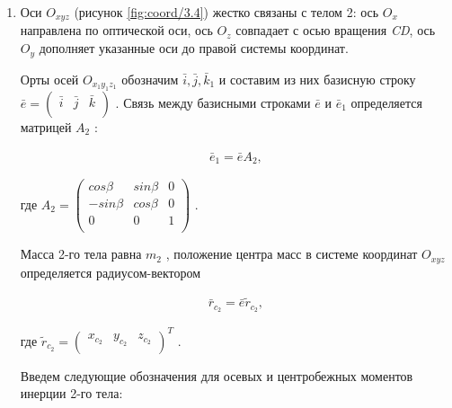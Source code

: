 \begin{enumerate}
	\item Оси  \( O_{xyz} \)  (рисунок \ref{fig:coord/3.4}) жестко связаны с телом 2: ось  \( O_x \)  направлена по оптической оси, ось  \( O_z \)  совпадает с осью вращения \textit{CD}, ось  \( O_y \)  дополняет указанные оси до правой системы координат.\par
	
	Орты осей  \( O_{x_{1}y_{1}z_{1}} \)  обозначим  \( \bar{i},\bar{j},\bar{k}_{1} \)  и составим из них базисную строку  
	\( \bar{e}= \left( \begin{matrix}	\bar{i}  &  \bar{j}  &  \bar{k}\\	\end{matrix}
	\right)  \) . Связь между базисными строками  \( \bar{e} \)  и  \( \bar{e}_{1} \)  определяется матрицей  \( A_{2} \) :\par
	
	\begin{equation}
	\label{eq:p3:5}
	\begin{alignedat}{2}
	\bar{e}_{1}=\bar{e}A_{2},
	\end{alignedat}
	\end{equation}
	
	где  \( A_{2}= \left( \begin{matrix}
	cos \beta   &  sin \beta   &  0\\
	-sin \beta   &  cos \beta   &  0\\
	0  &  0  &  1\\
	\end{matrix}
	\right)  \) .\par
	
	Масса 2-го тела равна  \( m_{2} \) , положение центра масс в системе координат  \( O_{xyz} \)  определяется радиусом-вектором\par
	
	\begin{equation}
	\label{eq:p3:6}
	\begin{alignedat}{2}
	\bar{r}_{c_{2}}=\bar{e} \tilde{r}_{c_{2}},
	\end{alignedat}
	\end{equation}
	
	где  \( \tilde{r}_{c_{2}}= \left( \begin{matrix}
	x_{c_{2}}  &  y_{c_{2}}  &  z_{c_{2}}\\
	\end{matrix}
	\right) ^{T} \) .\par
	
	Введем следующие обозначения для осевых и центробежных моментов инерции 2-го тела:\par
	

\end{enumerate}
